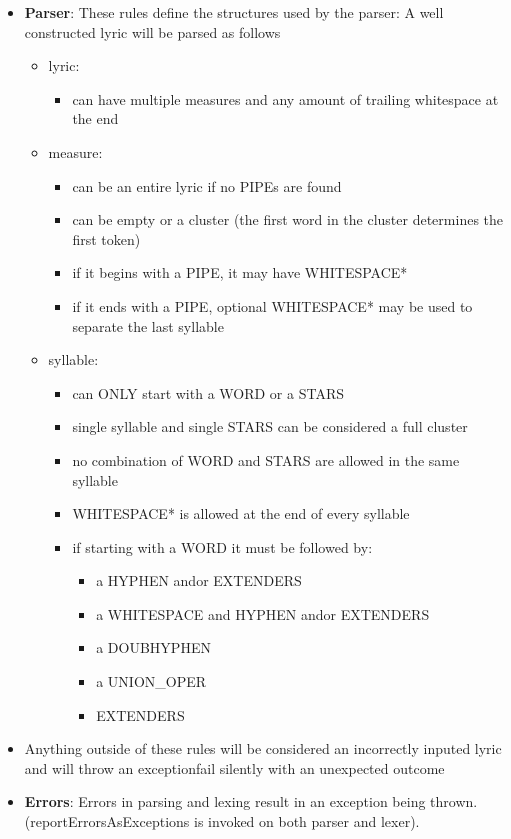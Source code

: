 \documentclass[12pt]{book}
\begin{document}
\begin{itemize}
\item {\bf Parser}:
These rules define the structures used by the parser:
A well constructed lyric will be parsed as follows
\begin{itemize} 
\item lyric:
\begin{itemize}
\item can have multiple measures and any amount of trailing whitespace at the end
\end{itemize}
\item measure:
\begin{itemize}
\item can be an entire lyric if no PIPEs are found
\item can be empty or a cluster (the first word in the cluster determines the first token)
\item if it begins with a PIPE, it may have WHITESPACE*
\item if it ends with a PIPE, optional WHITESPACE* may be used to separate the last syllable
\end{itemize}
\item syllable:
\begin{itemize} 
\item can ONLY start with a WORD or a STARS
\item single syllable and single STARS can be considered a full cluster
\item no combination of WORD and STARS are allowed in the same syllable
\item WHITESPACE* is allowed at the end of every syllable
\item if starting with a WORD it must be followed by:
\begin{itemize}
\item a HYPHEN and\/or EXTENDERS
\item a WHITESPACE and HYPHEN and\/or EXTENDERS
\item a DOUBHYPHEN
\item a UNION\_OPER
\item EXTENDERS
\end{itemize}
\end{itemize}
\end{itemize}

\item Anything outside of these rules will be considered an incorrectly inputed
lyric and will throw an exception\/fail silently with an unexpected outcome

\item {\bf Errors}: Errors in parsing and lexing result in an exception being thrown. (reportErrorsAsExceptions is invoked on both parser and lexer).


\end{itemize}
\end{document}
